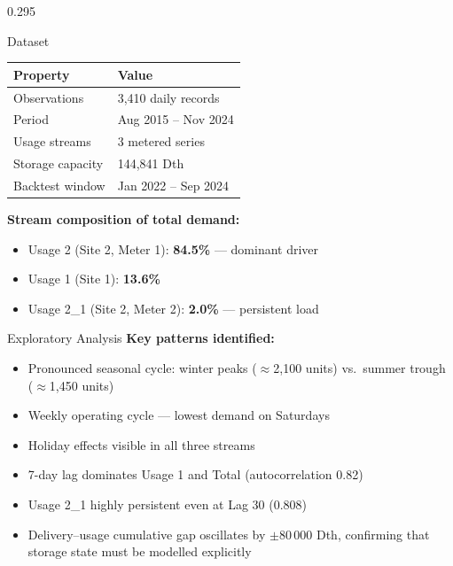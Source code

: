 \documentclass[final]{beamer}
\begin{document}
\begin{frame}[t]{}
\begin{columns}[T]
\begin{column}{0.295\paperwidth}
    \vspace{0.75cm}

    \begin{pbox}{Dataset}
      \small
      \begin{tabularx}{\linewidth}{@{}lX@{}}
        \toprule
        Property         & Value \\
        \midrule
        Observations     & 3,410 daily records \\
        Period           & Aug 2015 – Nov 2024 \\
        Usage streams    & 3 metered series \\
        Storage capacity & 144,841 Dth \\
        Backtest window  & Jan 2022 – Sep 2024 \\
        \bottomrule
      \end{tabularx}

      \vspace{0.6cm}
      \textbf{Stream composition of total demand:}
      \begin{itemize}
        \item Usage 2 (Site 2, Meter 1): \textbf{84.5\%} — dominant driver
        \item Usage 1 (Site 1): \textbf{13.6\%}
        \item Usage 2\_1 (Site 2, Meter 2): \textbf{2.0\%} — persistent load
      \end{itemize}
    \end{pbox}

    \vspace{0.75cm}

    \begin{pbox}{Exploratory Analysis}
      \small
      \textbf{Key patterns identified:}
      \begin{itemize}
        \item Pronounced seasonal cycle: winter peaks ($\approx$2,100 units)
              vs.\ summer trough ($\approx$1,450 units)
        \item Weekly operating cycle — lowest demand on Saturdays
        \item Holiday effects visible in all three streams
        \item 7-day lag dominates Usage 1 and Total (autocorrelation 0.82)
        \item Usage 2\_1 highly persistent even at Lag 30 (0.808)
        \item Delivery–usage cumulative gap oscillates by $\pm$80\,000 Dth,
              confirming that storage state must be modelled explicitly
      \end{itemize}


\end{pbox}
\end{column}
\end{columns}
\end{frame}
\end{document}
